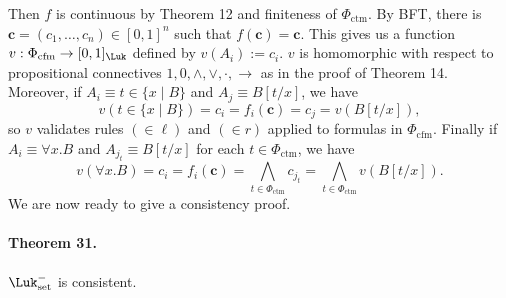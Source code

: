 Then $f$ is continuous by Theorem 12 and finiteness of $\Phi_{\mathrm{ctm}}$. By BFT, there is $\mathbf c=(c_1,\ldots,c_n)\in[0,1]^n$ such that $f(\mathbf c)=\mathbf c$. This gives us a function $v:\Phi_{\mathrm{cfm}}\to[0,1]_{\Luk}$ defined by $v(A_i):=c_i$.
$v$ is homomorphic with respect to propositional connectives $1,0,\wedge,\vee,\cdot,\to$ as in the proof of Theorem 14. Moreover, if $A_i\equiv t\in\{x\mid B\}$ and $A_j\equiv B[t/x]$, we have
\begin{equation}
 v(t\in\{x\mid B\})=c_i=f_i(\mathbf c)=c_j=v(B[t/x]),\tag{5}
\end{equation}
so $v$ validates rules $(\in\ell)$ and $(\in r)$ applied to formulas in $\Phi_{\mathrm{cfm}}$. Finally if $A_i\equiv\forall x.B$ and $A_{j_t}\equiv B[t/x]$ for each $t\in\Phi_{\mathrm{ctm}}$, we have
\begin{equation}
 v(\forall x.B)=c_i=f_i(\mathbf c)=\bigwedge_{t\in\Phi_{\mathrm{ctm}}}c_{j_t}
 =\bigwedge_{t\in\Phi_{\mathrm{ctm}}}v(B[t/x]).\tag{6}
\end{equation}
We are now ready to give a consistency proof.
\paragraph{Theorem 31.} $\Luk_{\mathrm{set}}^{-}$ is consistent.
